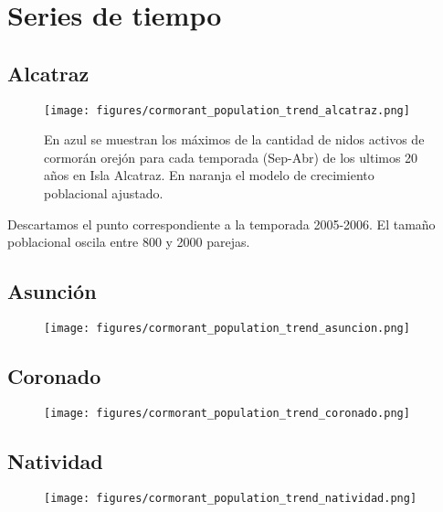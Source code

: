 \documentclass{article} %
\begin{document}
\section*{Series de tiempo}

\subsection*{Alcatraz}

\begin{figure}[H]
\hspace{-2cm}
    \texttt{[image: figures/cormorant\_population\_trend\_alcatraz.png]}
\caption{En azul se muestran los máximos de la cantidad de nidos activos de cormorán orejón para cada temporada (Sep-Abr) de los ultimos 20 años en Isla Alcatraz. En naranja el modelo de crecimiento poblacional ajustado.}
\end{figure}

Descartamos el punto correspondiente a la temporada 2005-2006. El tamaño poblacional oscila entre 800 y 2000 parejas. 

\subsection*{Asunción}

\begin{figure}[H]
\hspace{-2cm}
    \texttt{[image: figures/cormorant\_population\_trend\_asuncion.png]}
\caption{}
\end{figure}

\subsection*{Coronado}

\begin{figure}[H]
\hspace{-2cm}
    \texttt{[image: figures/cormorant\_population\_trend\_coronado.png]}
\caption{}
\end{figure}

\subsection*{Natividad}

\begin{figure}[H]
\hspace{-2cm}
    \texttt{[image: figures/cormorant\_population\_trend\_natividad.png]}
\caption{}
\end{figure}
\end{document}
